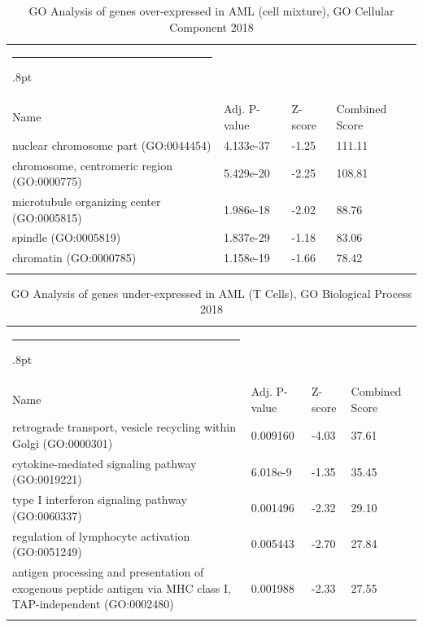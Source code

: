 \documentclass[3p,authoryear,preprint,12pt]{elsarticle}
\makeatletter
\def\hlinewd#1{%
  \noalign{\ifnum0=`}\fi\hrule \@height #1%
  \futurelet\reserved@a\@xhline}
\def\tbltoprule{\hlinewd{.8pt}\\[-12pt]}
\def\tblbottomrule{\noalign{\vspace*{6pt}}\hline\noalign{\vspace*{2pt}}}
\def\tblmidrule{\noalign{\vspace*{6pt}}\hline\noalign{\vspace*{2pt}}}
\makeatother
\begin{document}
\begin{table}[!htbp]
	\caption{{GO Analysis of genes over-expressed in AML (cell mixture), GO Cellular Component 2018} }
	\label{tw-de478ae31jc6}
	\def\arraystretch{1}
	\ignorespaces 
	\centering 
	\begin{tabulary}{\linewidth}{p{\dimexpr.65\tabcolsep}p{\dimexpr.15\tabcolsep}p{\dimexpr.1\tabcolsep}p{\dimexpr.1\tabcolsep}}
		\tbltoprule Name & Adj. P-value & Z-score & Combined Score\\
		\tblmidrule
nuclear chromosome part (GO:0044454) & 4.133e-37 & -1.25 & 111.11 \\
chromosome, centromeric region (GO:0000775) & 5.429e-20 & -2.25 & 108.81 \\
microtubule organizing center (GO:0005815) & 1.986e-18 & -2.02 & 88.76 \\
spindle (GO:0005819) & 1.837e-29 & -1.18 & 83.06 \\
chromatin (GO:0000785) & 1.158e-19 & -1.66 & 78.42 \\
		\tblbottomrule
	\end{tabulary}\par 
\end{table}
\begin{table}[!htbp]
	\caption{{GO Analysis of genes under-expressed in AML (T Cells), GO Biological Process 2018} }
	\label{tw-de478ae31kc6}
	\def\arraystretch{1}
	\ignorespaces 
	\centering 
	\begin{tabulary}{\linewidth}{p{\dimexpr.65\tabcolsep}p{\dimexpr.15\tabcolsep}p{\dimexpr.1\tabcolsep}p{\dimexpr.1\tabcolsep}}
		\tbltoprule Name & Adj. P-value & Z-score & Combined Score\\
		\tblmidrule
retrograde transport, vesicle recycling within Golgi (GO:0000301) & 0.009160 & -4.03 & 37.61 \\
cytokine-mediated signaling pathway (GO:0019221) & 6.018e-9 & -1.35 & 35.45 \\
type I interferon signaling pathway (GO:0060337) & 0.001496 & -2.32 & 29.10 \\
regulation of lymphocyte activation (GO:0051249) & 0.005443 & -2.70 & 27.84 \\
antigen processing and presentation of exogenous peptide antigen via MHC class I, TAP-independent (GO:0002480) & 0.001988 & -2.33 & 27.55 \\
		\tblbottomrule
	\end{tabulary}\par 
\end{table}
\end{document}
